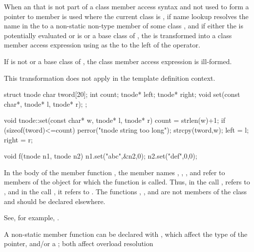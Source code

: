 \pnum
When an  that is not part of a
class member access syntax and not used to form a
pointer to member is used
where the current class is ,
if name
lookup resolves the name in the
 to a non-static non-type member of some class
,
and if either the  is potentially evaluated or
 is  or a base class of ,
the  is transformed into a class
member access expression using
 as the 
to the left of the  operator.
\begin{note}
If  is not  or a base class of , the class
member access expression is ill-formed.
\end{note}
This transformation does not apply in the
template definition context.
\begin{example}
\begin{codeblock}
struct tnode {
  char tword[20];
  int count;
  tnode* left;
  tnode* right;
  void set(const char*, tnode* l, tnode* r);
};

void tnode::set(const char* w, tnode* l, tnode* r) {
  count = strlen(w)+1;
  if (sizeof(tword)<=count)
      perror("tnode string too long");
  strcpy(tword,w);
  left = l;
  right = r;
}

void f(tnode n1, tnode n2) {
  n1.set("abc",&n2,0);
  n2.set("def",0,0);
}
\end{codeblock}

In the body of the member function , the member names
, , , and  refer to
members of the object for which the function is called. Thus, in the
call ,  refers to
, and in the call , it refers
to . The functions , , and
 are not members of the class  and should be
declared elsewhere.
\begin{footnote}
See, for example, .
\end{footnote}
\end{example}

\pnum
{}%
%
%
\begin{note}
A non-static member function can be declared with
, which affect the type of the 
pointer,
and/or a ;
both affect overload resolution
\end{note}

